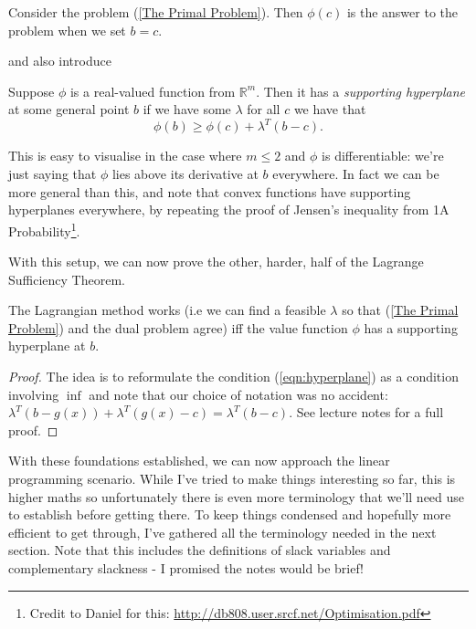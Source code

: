 \documentclass[11pt]{scrartcl}
\begin{document}
\begin{definition}
Consider the problem (\ref{The Primal Problem}). Then $\phi(c)$ is the answer to the problem when we set $b=c$.
\end{definition}

and also introduce

\begin{definition}
Suppose $\phi$ is a real-valued function from $\mathbb{R}^m$. Then it has a \emph{supporting hyperplane} at some general point $b$ if we have some $\lambda$ for all $c$ we have that 
\begin{equation}
    \phi(b) \ge \phi(c) + \lambda^T(b - c).
\label{eqn:hyperplane}
\end{equation}
\end{definition}

This is easy to visualise in the case where $m \le 2$ and $\phi$ is differentiable: we're just saying that $\phi$ lies above its derivative at $b$ everywhere. In fact we can be more general than this, and note that convex functions have supporting hyperplanes everywhere, by repeating the proof of Jensen's inequality from 1A Probability\footnote{Credit to Daniel for this: \url{http://db808.user.srcf.net/Optimisation.pdf}}.

With this setup, we can now prove the other, harder, half of the Lagrange Sufficiency Theorem.

\begin{theorem}
The Lagrangian method works (i.e we can find a feasible $\lambda$ so that (\ref{The Primal Problem}) and the dual problem agree) iff the value function $\phi$ has a supporting hyperplane at $b$.
\begin{proof}
The idea is to reformulate the condition (\ref{eqn:hyperplane}) as a condition involving $\inf$ and note that our choice of notation was no accident: $\lambda^T (b - g(x)) + \lambda^T (g(x) - c) = \lambda^T (b - c)$. See lecture notes for a full proof.
\end{proof}
\end{theorem}

With these foundations established, we can now approach the linear programming scenario. While I've tried to make things interesting so far, this is higher maths so unfortunately there is even more terminology that we'll need use to establish before getting there. To keep things condensed and hopefully more efficient to get through, I've gathered all the terminology needed in the next section. Note that this includes the definitions of slack variables and complementary slackness - I promised the notes would be brief!
\end{document}

